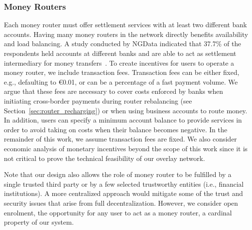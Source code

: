 \subsubsection*{Money Routers}
Each money router must offer settlement services with at least two different bank accounts.
Having many money routers in the network directly benefits availability and load balancing.
A study conducted by NGData indicated that 37.7\% of the respondents held accounts at different banks and are able to act as settlement intermediary for money transfers~\cite{ngdata2014consumer}.
To create incentives for users to operate a money router, we include transaction fees.
Transaction fees can be either fixed, e.g., defaulting to \euro 0.01, or can be a percentage of a fast payment volume.
We argue that these fees are necessary to cover costs enforced by banks when initiating cross-border payments during router rebalancing (see Section~\ref{sec:router_recharging}) or when using business accounts to route money.
In addition, users can specify a minimum account balance to provide services in order to avoid taking on costs when their balance becomes negative.
In the remainder of this work, we assume transaction fees are fixed.
We also consider economic analysis of monetary incentives beyond the scope of this work since it is not critical to prove the technical feasibility of our overlay network.

Note that our design also allows the role of money router to be fulfilled by a single trusted third party or by a few selected trustworthy entities (i.e., financial institutions).
A more centralized approach would mitigate some of the trust and security issues that arise from full decentralization.
However, we consider open enrolment, the opportunity for any user to act as a money router, a cardinal property of our system.

